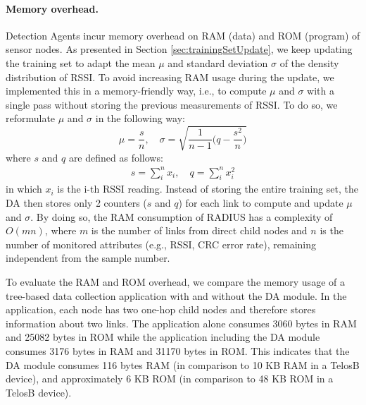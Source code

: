 \paragraph{Memory overhead.} Detection Agents incur memory overhead on RAM (data) and ROM (program) of sensor nodes. As presented in Section \ref{sec:trainingSetUpdate}, we keep updating the training set to adapt the mean $\mu$ and standard deviation $\sigma$ of the density distribution of RSSI. To avoid increasing RAM usage during the update, we implemented this in a memory-friendly way, i.e., to compute $\mu$ and $\sigma$ with a single pass without storing the previous measurements of RSSI. To do so, we reformulate $\mu$  and $\sigma$ in the following way:
\setlength{\belowdisplayskip}{2pt} \setlength{\belowdisplayshortskip}{2pt}
\setlength{\abovedisplayskip}{2pt} \setlength{\abovedisplayshortskip}{2pt}
\begin{equation} \label{equ:stdComputation}
\mu = \frac{s}{n},   \quad  \sigma = \sqrt{\frac{1}{n-1}\big(q - \frac{s^2}{n}\big)}
\end{equation}
where $s$ and $q$ are defined as follows:
\begin{align}
s= \displaystyle \sum_i^n{x_i},\quad  q = \displaystyle \sum_i^n{x_i^2}
\end{align}
in which $x_i$ is the i-th RSSI reading. Instead of storing the entire training set, the DA then stores only 2 counters ($s$ and $q$) for each link to compute and update $\mu$ and $\sigma$. By doing so, the RAM consumption of RADIUS has a complexity of $O(mn)$, where $m$ is the number of links from direct child nodes and $n$ is the number of monitored attributes (e.g., RSSI, CRC error rate), remaining independent from the sample number.

To evaluate the RAM and ROM overhead, we compare the memory usage of a tree-based data collection application with and without the DA module. In the application, each node has two one-hop child nodes and therefore stores information about two links. The application alone consumes 3060 bytes in RAM and 25082 bytes in ROM while the application including the DA module consumes 3176 bytes in RAM and 31170 bytes in ROM. This indicates that the DA module consumes 116 bytes RAM (in comparison to 10 KB RAM in a TelosB device), and approximately 6 KB ROM (in comparison to 48 KB ROM in a TelosB device). %

